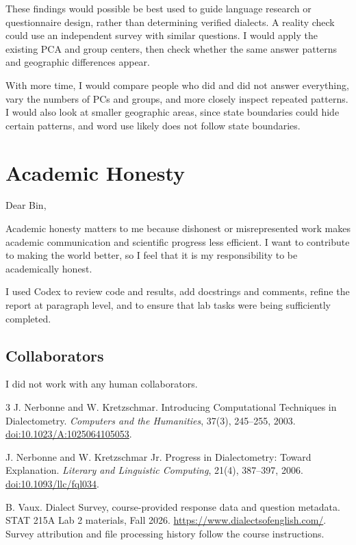 \documentclass{article}
\begin{document}
These findings would possible be best used to guide language research or questionnaire design, rather than determining verified dialects. A reality check could use an independent survey with similar questions. I would apply the existing PCA and group centers, then check whether the same answer patterns and geographic differences appear.

With more time, I would compare people who did and did not answer everything, vary the numbers of PCs and groups, and more closely inspect repeated patterns. I would also look at smaller geographic areas, since state boundaries could hide certain patterns, and word use likely does not follow state boundaries.

\section{Academic Honesty}\label{honesty}

Dear Bin,

Academic honesty matters to me because dishonest or misrepresented work makes academic communication and scientific progress less efficient. I want to contribute to making the world better, so I feel that it is my responsibility to be academically honest.

I used Codex to review code and results, add docstrings and comments, refine the report at paragraph level, and to ensure that lab tasks were being sufficiently completed.

\subsection{Collaborators}
I did not work with any human collaborators.

\begin{thebibliography}{3}
J. Nerbonne and W. Kretzschmar.
Introducing Computational Techniques in Dialectometry.
\emph{Computers and the Humanities}, 37(3), 245--255, 2003.
\href{https://doi.org/10.1023/A:1025064105053}{doi:10.1023/A:1025064105053}.

J. Nerbonne and W. Kretzschmar Jr.
Progress in Dialectometry: Toward Explanation.
\emph{Literary and Linguistic Computing}, 21(4), 387--397, 2006.
\href{https://doi.org/10.1093/llc/fql034}{doi:10.1093/llc/fql034}.

B. Vaux. Dialect Survey, course-provided response data and question metadata.
STAT 215A Lab 2 materials, Fall 2026.
\url{https://www.dialectsofenglish.com/}. Survey attribution and file processing history follow the course instructions.

\end{thebibliography}
\end{document}

